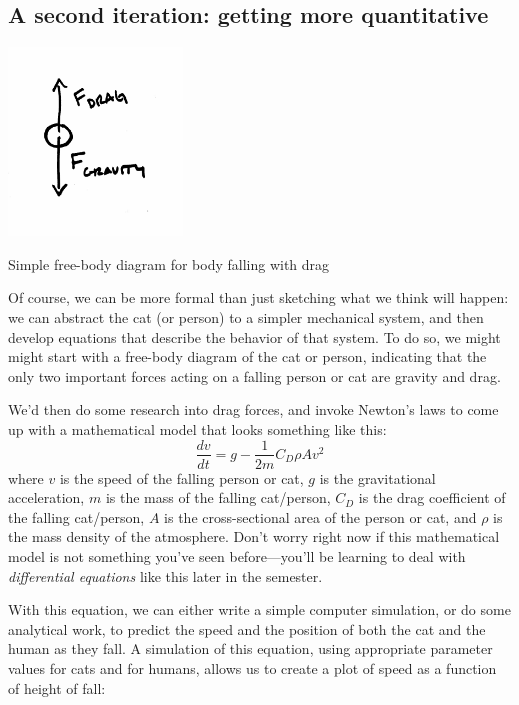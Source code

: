 \subsection{A second iteration: getting more quantitative}
\begin{marginfigure}
\centerline{\includegraphics[height=5cm]{figs/CatFBD}}
\caption{Simple free-body diagram for body falling with drag}
\end{marginfigure}

Of course, we can be more formal than just sketching what we think
will happen: we can abstract the cat (or person) to a simpler
mechanical system, and then develop equations that describe the
behavior of that system.  To do so, we might might start with a
free-body diagram of the cat or person, indicating that the only two
important forces acting on a falling person or cat are gravity and
drag.

We'd then do some research into drag forces, and invoke Newton's laws
to come up with a mathematical model that looks something like this:
%
$$ \frac{dv}{dt} = g - \frac{1}{2m} C_D \rho A v^2$$
%
where $v$ is the speed of the falling person or cat, $g$ is the
gravitational acceleration, $m$ is the mass of the falling cat/person,
$C_D$ is the drag coefficient of the falling cat/person, $A$ is the
cross-sectional area of the person or cat, and $\rho$ is the mass
density of the atmosphere.  Don't worry right now if this mathematical
model is not something you've seen before---you'll be learning to deal
with {\it differential equations} like this later in the semester.

With this equation, we can either write a simple computer simulation,
or do some analytical work, to predict the speed and the position of
both the cat and the human as they fall.  A simulation of this
equation, using appropriate parameter values for cats and for humans,
allows us to create a plot of speed as a function of height of fall:

